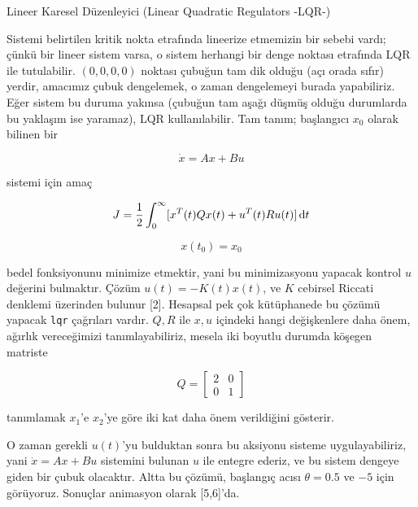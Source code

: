 \documentclass[12pt,fleqn]{article}\usepackage{../../common}
\begin{document}
Lineer Karesel Düzenleyici (Linear Quadratic Regulators -LQR-)

Sistemi belirtilen kritik nokta etrafında lineerize etmemizin bir sebebi
vardı; çünkü bir lineer sistem varsa, o sistem herhangi bir denge noktası
etrafında LQR ile tutulabilir. $(0,0,0,0)$ noktası çubuğun tam dik olduğu
(açı orada sıfır) yerdir, amacımız çubuk dengelemek, o zaman dengelemeyi
burada yapabiliriz. Eğer sistem bu duruma yakınsa (çubuğun tam aşağı düşmüş
olduğu durumlarda bu yaklaşım ise yaramaz), LQR kullanılabilir. Tam tanım;
başlangıcı $x_0$ olarak bilinen bir

$$
\dot{x} = A x + B u
$$

sistemi için amaç

$$
J = \frac{1}{2} \int_{0}^{\infty} [ x^T(t) Q x(t) + u^T(t) R u(t) ] \,\mathrm{d} t
$$

$$
x(t_0) = x_0
$$

bedel fonksiyonunu minimize etmektir, yani bu minimizasyonu yapacak kontrol
$u$ değerini bulmaktır. Çözüm $u(t) = -K(t) x (t)$, ve $K$ cebirsel
Riccati denklemi üzerinden bulunur [2]. Hesapsal pek çok kütüphanede bu
çözümü yapacak \verb!lqr! çağrıları vardır. $Q,R$ ile $x,u$ içindeki hangi
değişkenlere daha önem, ağırlık vereceğimizi tanımlayabiliriz, mesela iki
boyutlu durumda köşegen matriste 

$$
Q = \left[\begin{array}{rrr}
2 & 0 \\ 0 & 1
\end{array}\right]
$$

tanımlamak $x_1$'e $x_2$'ye göre iki kat daha önem verildiğini gösterir. 

O zaman gerekli $u(t)$'yu bulduktan sonra bu aksiyonu sisteme
uygulayabiliriz, yani $\dot{x} = A x + B u$ sistemini bulunan $u$ ile
entegre ederiz, ve bu sistem dengeye giden bir çubuk olacaktır. Altta bu
çözümü, başlangıç acısı $\theta = 0.5$ ve $-5$ için görüyoruz. Sonuçlar
animasyon olarak [5,6]'da.
\end{document}
